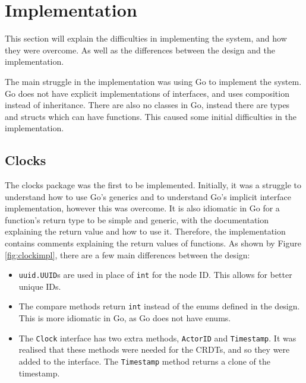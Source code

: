 \documentclass[12pt]{report}
\begin{document}
\chapter{Implementation}\label{sec:implementation}
This section will explain the difficulties in implementing the system, and how they were overcome. As well as the differences between the design and the implementation. \par
The main struggle in the implementation was using Go to implement the system. Go does not have explicit implementations of interfaces, and uses composition instead of inheritance. There are also no classes in Go, instead there are types and structs which can have functions. This caused some initial difficulties in the implementation. \par

\section{Clocks}
The clocks package was the first to be implemented. Initially, it was a struggle to understand how to use Go's generics and to understand Go's implicit interface implementation, however this was overcome. It is also idiomatic in Go for a function's return type to be simple and generic, with the documentation explaining the return value and how to use it. Therefore, the implementation contains comments explaining the return values of functions. As shown by Figure \ref{fig:clockimpl}, there are a few main differences between the design:

\begin{itemize}
    \item \texttt{uuid.UUID}s are used in place of \texttt{int} for the node ID. This allows for better unique IDs.
    \item The compare methods return \texttt{int} instead of the enums defined in the design. This is more idiomatic in Go, as Go does not have enums.
    \item The \texttt{Clock} interface has two extra methods, \texttt{ActorID} and \texttt{Timestamp}. It was realised that these methods were needed for the CRDTs, and so they were added to the interface. The \texttt{Timestamp} method returns a clone of the timestamp.
\end{itemize}
\end{document}
